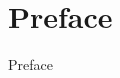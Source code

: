 
\begin{flushright}{\slshape 
}
\end{flushright}

\clearpage

\begingroup
\let\clearpage\relax
\let\cleardoublepage\relax
\let\cleardoublepage\relax
\chapter*{Preface}
Preface
%


\endgroup